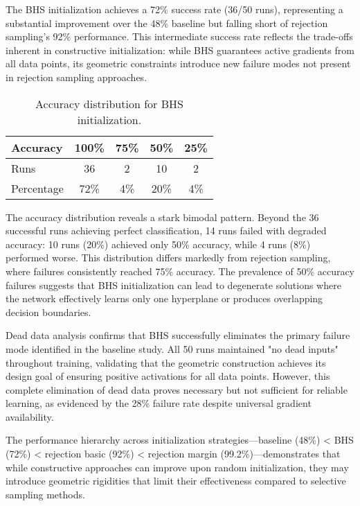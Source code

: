 The BHS initialization achieves a 72\% success rate (36/50 runs), representing a substantial improvement over the 48\% baseline but falling short of rejection sampling's 92\% performance. This intermediate success rate reflects the trade-offs inherent in constructive initialization: while BHS guarantees active gradients from all data points, its geometric constraints introduce new failure modes not present in rejection sampling approaches.

\begin{table}[ht]
\centering
\caption{Accuracy distribution for BHS initialization.}
\label{tab:relu1-bhs-accuracy-dist}
\begin{tabular}{lcccc}
\toprule
Accuracy & 100\% & 75\% & 50\% & 25\% \\
\midrule
Runs & 36 & 2 & 10 & 2 \\
Percentage & 72\% & 4\% & 20\% & 4\% \\
\bottomrule
\end{tabular}
\end{table}

The accuracy distribution reveals a stark bimodal pattern. Beyond the 36 successful runs achieving perfect classification, 14 runs failed with degraded accuracy: 10 runs (20\%) achieved only 50\% accuracy, while 4 runs (8\%) performed worse. This distribution differs markedly from rejection sampling, where failures consistently reached 75\% accuracy. The prevalence of 50\% accuracy failures suggests that BHS initialization can lead to degenerate solutions where the network effectively learns only one hyperplane or produces overlapping decision boundaries.

Dead data analysis confirms that BHS successfully eliminates the primary failure mode identified in the baseline study. All 50 runs maintained "no dead inputs" throughout training, validating that the geometric construction achieves its design goal of ensuring positive activations for all data points. However, this complete elimination of dead data proves necessary but not sufficient for reliable learning, as evidenced by the 28\% failure rate despite universal gradient availability.

The performance hierarchy across initialization strategies—baseline (48\%) < BHS (72\%) < rejection basic (92\%) < rejection margin (99.2\%)—demonstrates that while constructive approaches can improve upon random initialization, they may introduce geometric rigidities that limit their effectiveness compared to selective sampling methods.

